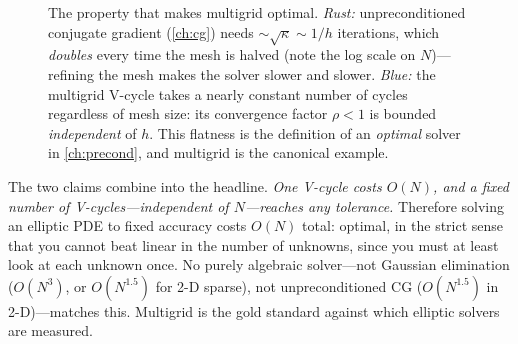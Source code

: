 \begin{figure}[t]
\centering
{}
\caption[Mesh-independent convergence]{The property that makes multigrid optimal.
\emph{Rust:} unpreconditioned conjugate gradient (\cref{ch:cg}) needs $\sim\sqrt{\kappa}\sim
1/h$ iterations, which \emph{doubles} every time the mesh is halved (note the log scale on
$N$)---refining the mesh makes the solver slower and slower. \emph{Blue:} the multigrid
V-cycle takes a nearly constant number of cycles regardless of mesh size: its convergence
factor $\rho<1$ is bounded \emph{independent} of $h$. This flatness is the definition of an
\emph{optimal} solver in \cref{ch:precond}, and multigrid is the canonical example.}
\label{fig:meshindep}
\end{figure}

\begin{keyidea}
The two claims combine into the headline. \emph{One V-cycle costs $O(N)$, and a fixed
number of V-cycles---independent of $N$---reaches any tolerance.} Therefore solving an
elliptic PDE to fixed accuracy costs $O(N)$ total: optimal, in the strict sense that you
cannot beat linear in the number of unknowns, since you must at least look at each unknown
once. No purely algebraic solver---not Gaussian elimination ($O(N^3)$, or $O(N^{1.5})$ for
2-D sparse), not unpreconditioned CG ($O(N^{1.5})$ in 2-D)---matches this. Multigrid is the
gold standard against which elliptic solvers are measured.
\end{keyidea}

